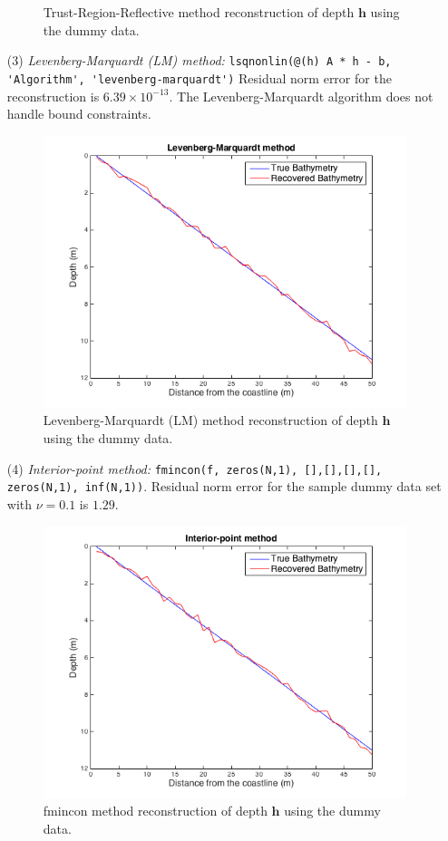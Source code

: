 \begin{itemize}
\begin{figure}[H]
\caption{Trust-Region-Reflective method reconstruction of depth $\mathbf{h}$ using the dummy data.}
\label{trust_region_fig}
\end{figure}
\item[(3)]  \textit{Levenberg-Marquardt (LM) method:}  
\verb|lsqnonlin(@(h) A * h - b, 'Algorithm', 'levenberg-marquardt')|
Residual norm error for the reconstruction is $6.39 \times 10^{-13}$. The Levenberg-Marquardt algorithm does not handle bound constraints. 
\begin{figure}[H]
\center
\includegraphics[scale=0.6]{img/LM_linear.png} 
\caption{Levenberg-Marquardt (LM) method reconstruction of depth $\mathbf{h}$ using the dummy data.}
\label{LM_fig}
\end{figure}
\item[(4)]  \textit{Interior-point method:} \verb|fmincon(f, zeros(N,1), [],[],[],[], zeros(N,1), inf(N,1))|. Residual norm error for the sample dummy data set  with $\nu = 0.1$ is $1.29$. 
\begin{figure}[H]
\center
\includegraphics[scale=0.6]{img/fmincon_linear.png} 
\caption{fmincon method reconstruction of depth $\mathbf{h}$ using the dummy data.}
\label{LM_fig}
\end{figure}
\end{itemize}
